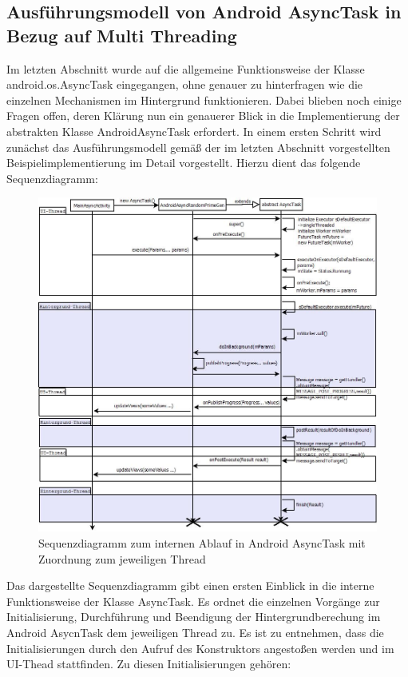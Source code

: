 \documentclass[12pt,oneside,a4paper,bibtotoc,liststotoc]{scrreprt}
\begin{document}
\subsection{Ausführungsmodell von Android AsyncTask in Bezug auf Multi Threading}
Im letzten Abschnitt wurde auf die allgemeine Funktionsweise der Klasse android.os.AsyncTask eingegangen, ohne genauer zu hinterfragen wie die einzelnen Mechanismen im Hintergrund funktionieren. Dabei blieben noch einige Fragen offen, deren Klärung nun ein genauerer Blick in die Implementierung der abstrakten Klasse AndroidAsyncTask erfordert. In einem ersten Schritt wird zunächst das Ausführungsmodell gemäß der im letzten Abschnitt vorgestellten Beispielimplementierung im Detail vorgestellt. Hierzu dient das folgende Sequenzdiagramm:
\begin{figure}[H]
  \begin{centering}
    \includegraphics[height=1\textwidth]{img/asyncTask_seqenzdiagramm.png}
    \caption{Sequenzdiagramm zum internen Ablauf in Android AsyncTask mit Zuordnung zum jeweiligen Thread}
    \label{asyncTask_seqenzdiagramm}
  \end{centering}
\end{figure}
Das dargestellte Sequenzdiagramm gibt einen ersten Einblick in die interne Funktionsweise der Klasse AsyncTask. Es ordnet die einzelnen Vorgänge zur Initialisierung, Durchführung und Beendigung der Hintergrundberechung im Android AsycnTask dem jeweiligen Thread zu.  Es ist zu entnehmen, dass die Initialisierungen durch den Aufruf des Konstruktors angestoßen werden und im UI-Thead stattfinden. Zu diesen Initialisierungen gehören:\newline
\end{document}
